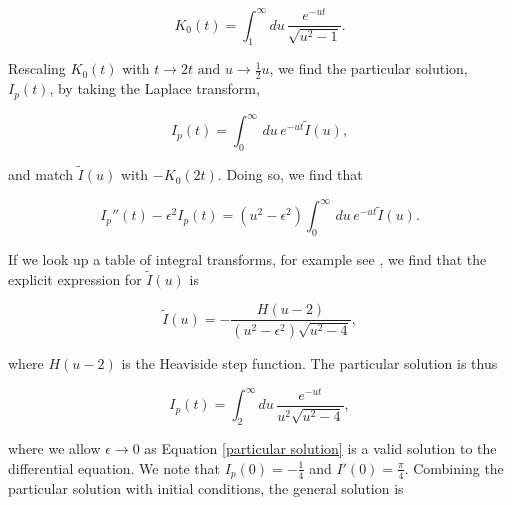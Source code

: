 \documentclass{article}
\numberwithin{equation}{section} %
\begin{document}
%
%

\begin{equation}
K_0(t) = \int^\infty_1 du \, \frac{e^{-ut}}{\sqrt{u^2-1}}.
\end{equation}

%

\noindent Rescaling $K_0(t)$ with $t\rightarrow 2t\,\, \mathrm{and\,}\, u \rightarrow \frac{1}{2}u$, we find the particular solution, $I_p(t)$, by taking the Laplace transform\cite{laplace},

\begin{equation}
I_p(t) = \int^\infty_0 \, du \, e^{-ut} \tilde{I}(u),
\end{equation}

\noindent and match $\tilde{I}(u)$ with $-K_0(2t)$. Doing so, we find that

\begin{equation}
I_p''(t) - \epsilon^2 I_p(t) = (u^2-\epsilon^2)\int^\infty_0 \, du \, e^{-ut} \tilde{I}(u).
\end{equation}

\noindent If we look up a table of integral transforms, for example see \cite{laplace}, we find that the explicit expression for $\tilde{I}(u)$ is

\begin{equation}
\tilde{I}(u) = -\frac{H(u-2)}{(u^2-\epsilon^2)\sqrt{u^2-4}},
\end{equation}

\noindent where $H(u-2)$ is the Heaviside step function. The particular solution is thus 

\begin{equation}
I_p(t) = \int^\infty_2 du \, \frac{e^{-ut}}{u^2\sqrt{u^2-4}},
\label{particular solution}
\end{equation}

\noindent where we allow $\epsilon\rightarrow 0$ as Equation \ref{particular solution} is a valid solution to the differential equation. We note that $I_p(0) = -\frac{1}{4}$ and $I'(0) = \frac{\pi}{4}$. Combining the particular solution with initial conditions, the general solution is
\end{document}
